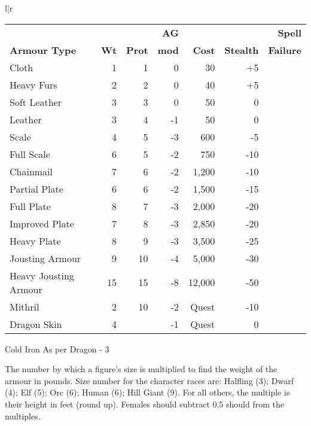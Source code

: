 \begin{tabular}[t]{l|r}
\begin{minipage}[t]{4.6in}
\begin{tabularx}{\linewidth}{Xrrrrrr}
	&	&	& \textbf{AG} & & & \textbf{Spell} \\
\textbf{Armour Type} & \textbf{Wt} & \textbf{Prot} & \textbf{mod} &
\textbf{Cost} & \textbf{Stealth} & \textbf{Failure} \\ \hline
Cloth			& 1 &  1 &  0 &     30 & +5 \\ \hline
Heavy Furs		& 2 &  2 &  0 &     40 & +5 \\ \hline
Soft Leather		& 3 &  3 &  0 &     50 &  0 \\ \hline
Leather			& 3 &  4 & -1 &     50 &  0 \\ \hline
Scale\dag		& 4 &  5 & -3 &    600 & -5 \\ \hline
Full Scale\dag		& 6 &  5 & -2 &    750 & -10 \\ \hline
Chainmail\dag		& 7 &  6 & -2 &  1,200 & -10 \\ \hline
Partial Plate\dag	& 6 &  6 & -2 &  1,500 & -15 \\ \hline
Full Plate\dag		& 8 &  7 & -3 &  2,000 & -20 \\ \hline
Improved Plate\dag	& 7 &  8 & -3 &  2,850 & -20 \\ \hline
Heavy Plate\dag		& 8 &  9 & -3 &  3,500 & -25 \\ \hline
Jousting Armour\dag	& 9 & 10 & -4 &  5,000 & -30 \\ \hline
Heavy Jousting Armour\dag & 15 & 15 & -8 & 12,000 & -50 \\ \hline
Mithril			& 2 & 10 & -2 & Quest & -10 \\ \hline
Dragon Skin		& 4 & \ddag & -1 & Quest & 0 \\ \hline
\end{tabularx}
\begin{flushleft}
\dag Cold Iron \hspace{2.0em}\ddag As per Dragon - 3 \\
\end{flushleft}

\begin{multicols}{2}
{\setlength\leftmargini{0pt}
\begin{description}
\setlength\itemsep{0pt}
\item[Weight] The number by which a figure's size is multiplied to
find the weight of the armour in pounds.  Size number for the
character races are: Halfling (3); Dwarf (4); Elf (5); Orc (6); Human
(6); Hill Giant (9).  For all others, the multiple is their height in
feet (round up).  Females should subtract 0.5 should from the
multiples.


\end{description}}
\end{multicols}
\end{minipage}
\end{tabular}
